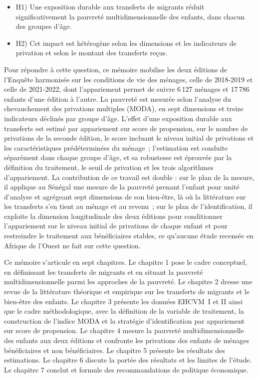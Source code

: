 \begin{itemize}
  \item H1) Une exposition durable aux transferts de migrants réduit
        significativement la pauvreté multidimensionnelle des enfants,
        dans chacun des groupes d'âge.
  \item H2) Cet impact est hétérogène selon les dimensions et les
        indicateurs de privation et selon le montant des transferts
        reçus.
\end{itemize}

Pour répondre à cette question, ce mémoire mobilise les deux éditions de
l'Enquête harmonisée sur les conditions de vie des ménages, celle de
2018-2019 et celle de 2021-2022, dont l'appariement permet de suivre
6\,127 ménages et 17\,786 enfants d'une édition à l'autre. La pauvreté est
mesurée selon l'analyse du chevauchement des privations multiples (MODA),
en sept dimensions et treize indicateurs
déclinés par groupe d'âge. L'effet d'une exposition durable aux transferts
est estimé par appariement sur score de propension, sur le nombre de
privations de la seconde édition, le score incluant le niveau initial de
privations et les caractéristiques prédéterminées du ménage~; l'estimation
est conduite séparément dans chaque groupe d'âge, et sa robustesse est
éprouvée par la définition du traitement, le seuil de privation et les
trois algorithmes d'appariement. La contribution de ce travail est double :
sur le plan de la mesure, il applique au Sénégal une mesure de la pauvreté
prenant l'enfant pour unité d'analyse et agrégeant sept dimensions de son
bien-être, là où la littérature sur les transferts s'en tient au ménage et
au revenu~; sur le plan de l'identification, il exploite la dimension
longitudinale des deux éditions pour conditionner l'appariement sur le
niveau initial de privations de chaque enfant et pour restreindre le
traitement aux bénéficiaires stables, ce qu'aucune étude recensée en
Afrique de l'Ouest ne fait sur cette question.

Ce mémoire s'articule en sept chapitres. Le chapitre 1 pose le cadre
conceptuel, en définissant les transferts de migrants et en situant la
pauvreté multidimensionnelle parmi les approches de la pauvreté. Le
chapitre 2 dresse une revue de la littérature théorique et empirique sur
les transferts de migrants et le bien-être des enfants. Le chapitre 3
présente les données EHCVM~I et II ainsi que le cadre méthodologique, avec
la définition de la variable de traitement, la construction de l'indice
MODA et la stratégie d'identification par appariement sur score de
propension. Le chapitre 4 mesure la pauvreté multidimensionnelle des
enfants aux deux éditions et confronte les privations des enfants de
ménages bénéficiaires et non bénéficiaires. Le chapitre 5 présente les
résultats des estimations. Le chapitre 6 discute la portée des résultats
et les limites de l'étude. Le chapitre 7 conclut et formule des
recommandations de politique économique.
